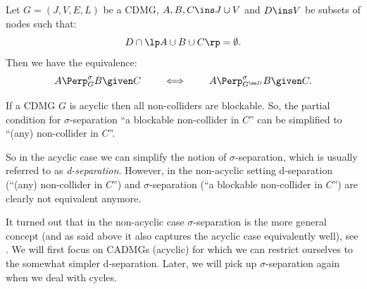 \begin{Lem}\label{lem:stability_separation_marginalization}
        Let $G=(J,V,E,L)$ be a CDMG, $A,B,C \ins J \cup V$ and $D \ins V$ 
        be subsets of nodes such that:
        \[ D \cap \lp A \cup B \cup C\rp = \emptyset.\]
        Then we have the equivalence:
        \[ A \Perp^\sigma_G B \given C \qquad \iff \qquad  A \Perp^\sigma_{G^{\sm D} }B \given C. \]
\end{Lem}

\begin{Rem}
    If a CDMG $G$ is acyclic then all non-colliders are blockable.
    So, the partial condition for $\sigma$-separation
    ``a blockable non-collider in $C$''
    can be simplified to ``(any) non-collider in $C$''.
    
    So in the acyclic case we can simplify the notion of $\sigma$-separation, 
    which is usually referred to as \emph{d-separation}.
    However, in the non-acyclic setting d-separation (``(any) non-collider in $C$'') and $\sigma$-separation (``a blockable non-collider in $C$'') are clearly not equivalent anymore.

    It turned out that in the non-acyclic case $\sigma$-separation is the more general concept (and as said above it also captures the acyclic case equivalently well), see \cite{FM17,FM18,FM20,BFPM21}.
    We will first focus on CADMGs (acyclic) for which we can restrict ourselves to the somewhat simpler d-separation.
    Later, we will pick up $\sigma$-separation again when we deal with cycles.
\end{Rem}

